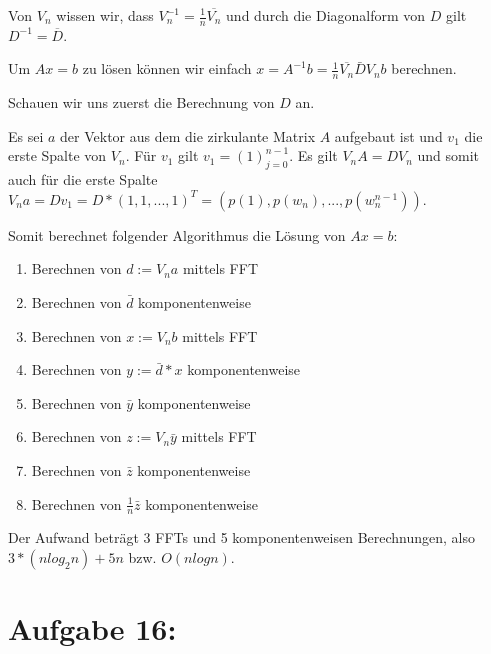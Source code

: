 \documentclass[]{article}
\begin{document}
Von $V_n$ wissen wir, dass $V_n^{-1} = \frac{1}{n} \overline{V_n}$ und durch die Diagonalform von $D$ gilt $D^{-1}=\overline{D}$.

Um $Ax=b$ zu lösen können wir einfach $x = A^{-1}b = \frac{1}{n} \overline{V_n} \bar{D}V_nb$ berechnen.

Schauen wir uns zuerst die Berechnung von $D$ an.

Es sei $a$ der Vektor aus dem die zirkulante Matrix $A$ aufgebaut ist und $v_1$ die erste Spalte von $V_n$. Für $v_1$ gilt $v_1 = (1)_{j=0}^{n-1}$. Es gilt $V_nA = DV_n$ und somit auch für die erste Spalte $V_na = Dv_1 = D*(1, 1, ..., 1)^T = (p(1), p(w_n), ..., p(w_n^{n-1}))$.

Somit berechnet folgender Algorithmus die Lösung von $Ax=b$:

\begin{enumerate}
	\item Berechnen von $d:=V_na$ mittels FFT
	\item Berechnen von $\bar{d}$ komponentenweise
	\item Berechnen von $x:=V_nb$ mittels FFT
	\item Berechnen von $y:=\bar{d}*x$ komponentenweise
	\item Berechnen von $\bar{y}$ komponentenweise
	\item Berechnen von $z:=V_n\bar{y}$ mittels FFT
	\item Berechnen von $\bar{z}$ komponentenweise
	\item Berechnen von $\frac{1}{n}\bar{z}$ komponentenweise
\end{enumerate}

Der Aufwand beträgt 3 FFTs und 5 komponentenweisen Berechnungen, also $3*(n log_2 n) + 5n$ bzw. $O(n log n)$.

\section{Aufgabe 16:}
\end{document}
